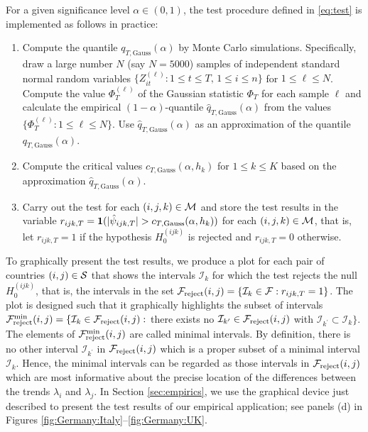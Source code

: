 \documentclass[a4paper,12pt]{article}
\numberwithin{equation}{section}
\begin{document}
For a given significance level $\alpha \in (0,1)$, the test procedure defined in \eqref{eq:test} is implemented as follows in practice: 
\begin{enumerate}[label=\textit{Step \arabic*.}, leftmargin=1.45cm]
\item Compute the quantile $q_{T,\text{Gauss}}(\alpha)$ by Monte Carlo simulations. Specifically, draw a large number $N$ (say $N=5000$) samples of independent standard normal random variables $\{Z_{it}^{(\ell)} : 1 \le t \le T, \, 1 \le i \le n \}$ for $1 \le \ell \le N$. Compute the value $\Phi_T^{(\ell)}$ of the Gaussian statistic $\Phi_T$ for each sample $\ell$ and calculate the empirical $(1-\alpha)$-quantile $\hat{q}_{T,\text{Gauss}}(\alpha)$ from the values $\{ \Phi_T^{(\ell)}: 1 \le \ell \le N \}$. Use $\hat{q}_{T,\text{Gauss}}(\alpha)$ as an approximation of the quantile $q_{T,\text{Gauss}}(\alpha)$. 
\item Compute the critical values $c_{T,\text{Gauss}}(\alpha,h_k)$ for $1 \le k \le K$ based on the approximation $\hat{q}_{T,\text{Gauss}}(\alpha)$.
\item Carry out the test for each $(i,j,k) \in \mathcal{M}$ and store the test results in the variable $r_{ijk,T} = \boldsymbol{1}( |\hat{\psi}_{ijk,T}| > c_{T,\text{Gauss}}(\alpha,h_k))$ for each $(i,j,k) \in \mathcal{M}$, that is, let $r_{ijk,T} = 1$ if the hypothesis $H_0^{(ijk)}$ is rejected and $r_{ijk,T} = 0$ otherwise. 
\end{enumerate}


To graphically present the test results, we produce a plot for each pair of countries $(i,j) \in \mathcal{S}$ that shows the intervals $\mathcal{I}_k$ for which the test rejects the null $H_0^{(ijk)}$, that is, the intervals in the set $\mathcal{F}_{\text{reject}}(i,j) = \{ \mathcal{I}_k \in \mathcal{F}: r_{ijk,T} = 1 \}$. The plot is designed such that it graphically highlights the subset of intervals $\mathcal{F}_{\text{reject}}^{\text{min}}(i,j) = \{ \mathcal{I}_k \in \mathcal{F}_{\text{reject}}(i,j):$ there exists no $\mathcal{I}_{k^\prime} \in \mathcal{F}_{\text{reject}}(i,j)$ with $\mathcal{I}_{k^\prime} \subset \mathcal{I}_k \}$. The elements of $\mathcal{F}_{\text{reject}}^{\text{min}}(i,j)$ are called minimal intervals. By definition, there is no other interval $\mathcal{I}_{k^\prime}$ in $\mathcal{F}_{\text{reject}}(i,j)$ which is a proper subset of a minimal interval $\mathcal{I}_k$. Hence, the minimal intervals can be regarded as those intervals in $\mathcal{F}_{\text{reject}}(i,j)$ which are most informative about the precise location of the differences between the trends $\lambda_i$ and $\lambda_j$. In Section \ref{sec:empirics}, we use the graphical device just described to present the test results of our empirical application; {\color{red}see} panels (d) in Figures \ref{fig:Germany:Italy}--\ref{fig:Germany:UK}.  
\end{document}
